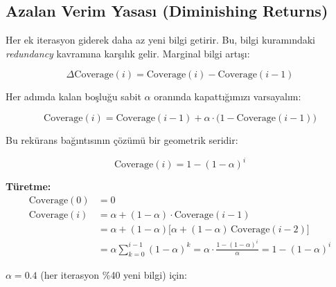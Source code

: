 \subsection{Azalan Verim Yasas{\i} (Diminishing Returns)}

Her ek iterasyon giderek daha az yeni bilgi getirir. Bu, bilgi kuram{\i}ndaki \emph{redundancy} kavram{\i}na kar\c{s}{\i}l{\i}k gelir. Marginal bilgi art{\i}\c{s}{\i}:

\begin{equation}
\label{eq:delta_coverage}
\Delta \text{Coverage}(i) = \text{Coverage}(i) - \text{Coverage}(i-1)
\end{equation}

Her ad{\i}mda kalan bo\c{s}lu\u{g}u sabit $\alpha$ oran{\i}nda kapatt{\i}\u{g}{\i}m{\i}z{\i} varsayal{\i}m:

\begin{equation}
\label{eq:coverage_recurrence}
\text{Coverage}(i) = \text{Coverage}(i-1) + \alpha \cdot \bigl(1 - \text{Coverage}(i-1)\bigr)
\end{equation}

Bu rek\"{u}rans ba\u{g}{\i}nt{\i}s{\i}n{\i}n \c{c}\"{o}z\"{u}m\"{u} bir geometrik seridir:

\begin{formulbox}
\begin{equation}
\label{eq:coverage_closed}
\text{Coverage}(i) = 1 - (1 - \alpha)^{i}
\end{equation}

\textbf{T\"{u}retme:}
\begin{align*}
\text{Coverage}(0) &= 0 \\
\text{Coverage}(i) &= \alpha + (1-\alpha) \cdot \text{Coverage}(i-1) \\
&= \alpha + (1-\alpha)\bigl[\alpha + (1-\alpha)\,\text{Coverage}(i-2)\bigr] \\
&= \alpha \sum_{k=0}^{i-1} (1-\alpha)^k = \alpha \cdot \frac{1 - (1-\alpha)^i}{\alpha} = 1 - (1-\alpha)^i
\end{align*}
\end{formulbox}

\begin{ornek}
$\alpha = 0.4$ (her iterasyon \%40 yeni bilgi) i\c{c}in:
\end{ornek}

